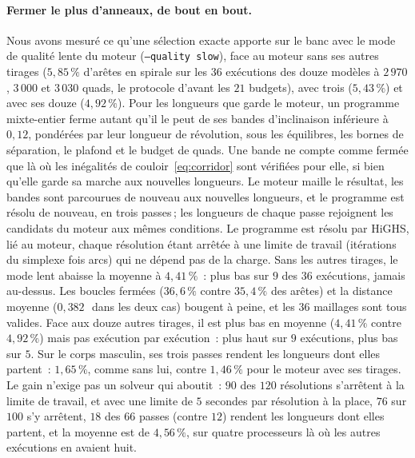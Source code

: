 \documentclass[11pt,a4paper]{article}
\begin{document}
\paragraph{Fermer le plus d'anneaux, de bout en bout.}
Nous avons mesuré ce qu'une sélection exacte apporte sur le banc avec le
mode de qualité lente du moteur (\texttt{--quality slow}), face au moteur
sans ses autres tirages ($5,85\,\%$ d'arêtes en spirale sur les $36$
exécutions des douze modèles à $2\,970$, $3\,000$ et $3\,030$ quads, le
protocole d'avant les $21$ budgets), avec trois ($5,43\,\%$) et avec ses
douze ($4,92\,\%$). Pour les
longueurs que garde le moteur, un programme mixte-entier ferme autant qu'il
le peut de ses bandes d'inclinaison inférieure à $0,12$, pondérées par leur
longueur de révolution, sous les équilibres, les bornes de séparation, le
plafond et le budget de quads. Une bande ne compte comme fermée que là où
les inégalités de couloir~\eqref{eq:corridor} sont vérifiées pour elle, si
bien qu'elle garde sa marche aux nouvelles longueurs. Le moteur maille le
résultat, les bandes sont parcourues de nouveau aux nouvelles longueurs, et
le programme est résolu de nouveau, en trois passes\,; les longueurs de
chaque passe rejoignent les candidats du moteur aux mêmes conditions. Le
programme est résolu par HiGHS, lié au moteur, chaque résolution étant
arrêtée à une limite de travail (itérations du simplexe fois arcs) qui ne
dépend pas de la charge. Sans les autres tirages, le mode lent abaisse la
moyenne à $4,41\,\%$~: plus bas sur $9$ des $36$ exécutions, jamais
au-dessus. Les boucles fermées ($36,6\,\%$ contre $35,4\,\%$ des arêtes) et
la distance moyenne ($0,382$\,\textperthousand\ dans les deux cas) bougent à
peine, et les $36$ maillages sont tous valides. Face aux douze autres
tirages, il est plus bas en moyenne ($4,41\,\%$ contre $4,92\,\%$) mais pas
exécution par exécution~: plus haut sur $9$ exécutions, plus bas sur $5$.
Sur le corps masculin, ses trois passes rendent les longueurs dont elles
partent~: $1,65\,\%$, comme sans lui, contre $1,46\,\%$ pour le moteur avec
ses tirages. Le gain n'exige pas un solveur qui aboutit~: $90$ des $120$
résolutions s'arrêtent à la limite de travail, et avec une limite de $5$
secondes par résolution à la place, $76$ sur $100$ s'y arrêtent, $18$ des
$66$ passes (contre $12$) rendent les longueurs dont elles partent, et la
moyenne est de $4,56\,\%$, sur quatre processeurs là où les autres
exécutions en avaient huit.
\end{document}

